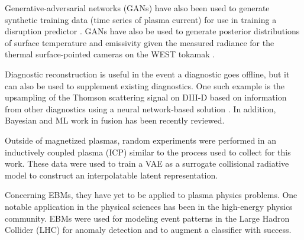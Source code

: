 Generative-adversarial networks (GANs) \cite{goodfellow_generative_2014} have also been used to generate synthetic training data (time series of plasma current) for use in training a disruption predictor \cite{dave_synthetic_2023}. GANs have also be used to generate posterior distributions of surface temperature and emissivity given the measured radiance for the thermal surface-pointed cameras on the WEST tokamak \cite{juven_generative_2024}. 

Diagnostic reconstruction is useful in the event a diagnostic goes offline, but it can also be used to supplement existing diagnostics.  One such example is the upsampling of the Thomson scattering signal on DIII-D based on information from other diagnostics using a neural network-based solution \cite{jalalvand_multimodal_2024}. In addition, Bayesian and ML work in fusion has been recently reviewed\cite{pavone_machine_2023}.

Outside of magnetized plasmas, random experiments were performed in an inductively coupled plasma (ICP) similar to the process used to collect for this work. These data were used to train a VAE as a surrogate collisional radiative model \cite{daly_data-driven_2023} to construct an interpolatable latent representation.

Concerning EBMs, they have yet to be applied to plasma physics problems. One notable application in the physical sciences has been in the high-energy physics community. EBMs were used for modeling event patterns in the Large Hadron Collider (LHC) for anomaly detection and to augment a classifier \cite{cheng_versatile_2024} with success.




